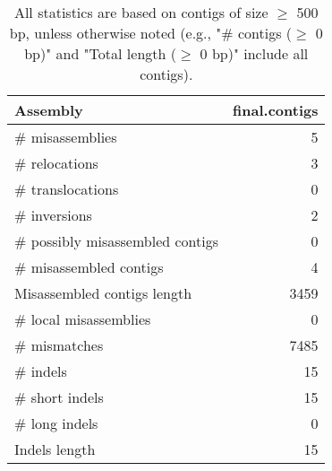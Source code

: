 \documentclass[12pt,a4paper]{article}
\begin{document}
\begin{table}[ht]
\begin{center}
\caption{All statistics are based on contigs of size $\geq$ 500 bp, unless otherwise noted (e.g., "\# contigs ($\geq$ 0 bp)" and "Total length ($\geq$ 0 bp)" include all contigs).}
\begin{tabular}{|l*{1}{|r}|}
\hline
Assembly & final.contigs \\ \hline
\# misassemblies & 5 \\ \hline
\hspace{5mm}\# relocations & 3 \\ \hline
\hspace{5mm}\# translocations & 0 \\ \hline
\hspace{5mm}\# inversions & 2 \\ \hline
\# possibly misassembled contigs & 0 \\ \hline
\# misassembled contigs & 4 \\ \hline
Misassembled contigs length & 3459 \\ \hline
\# local misassemblies & 0 \\ \hline
\# mismatches & 7485 \\ \hline
\# indels & 15 \\ \hline
\hspace{5mm}\# short indels & 15 \\ \hline
\hspace{5mm}\# long indels & 0 \\ \hline
Indels length & 15 \\ \hline
\end{tabular}
\end{center}
\end{table}
\end{document}
